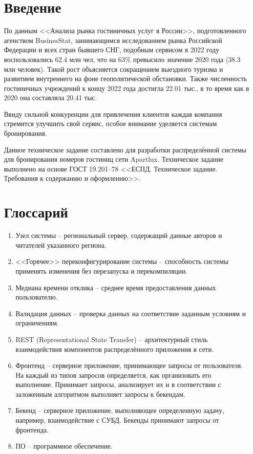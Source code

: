 \section*{Введение}
По данным <<Анализа рынка гостиничных услуг в России>>, подготовленного агенством BusinesStat, занимающимся исследованием рынка Российской Федерации и всех стран бывшего СНГ, подобным сервисом в 2022 году воспользовались 62.4 млн чел, что на 63\% превысило значение 2020 года (38.3 млн человек). Такой рост объясняется сокращением выездного туризма и развитием внутреннего на фоне геополитической обстановки. Также численность гостиничных учреждений к концу 2022 года достигла 22.01 тыс., в то время как в 2020 она составляла 20.41 тыс. 

Ввиду сильной конкуренции для привлечения клиентов каждая компания стремится улучшить свой сервис, особое внимание уделяется системам бронирования.

Данное техническое задание составлено для разработки распределённой системы для  бронирования номеров гостиниц сети Apartlux. Техническое задание выполнено на основе ГОСТ 19.201--78 <<ЕСПД. Техническое задание. Требования к содержанию и оформлению>>.

\section*{Глоссарий}
\begin{enumerate}
	\item Узел системы -- региональный сервер, содержащий данные авторов и читателей указанного региона.
	
	\item <<Горячее>> переконфигурирование системы -- способность системы применять изменения без перезапуска и перекомпиляции.
	
	\item Медиана времени отклика -- среднее время предоставления данных пользователю.
	
	\item Валидация данных  -- проверка данных на соответствие заданным условиям и ограничениям.
	
	\item REST (Representational State Transfer) -- архитектурный стиль взаимодействия компонентов распределённого приложения в сети. 
	
	\item Фронтенд -- серверное приложение, принимающее запросы от пользователя. На каждый из типов запросов определяется, как организовать его выполнение. Принимает запросы, анализирует их и в соответствии с заложенным алгоритмом выполняет запросы к бекендам.
	
	\item Бекенд -- серверное приложение, выполняющее определенную задачу, например, взаимодействие с СУБД. Бекенды принимают запросы от фронтенда.
	
	\item ПО -- программное обеспечение.
\end{enumerate}

